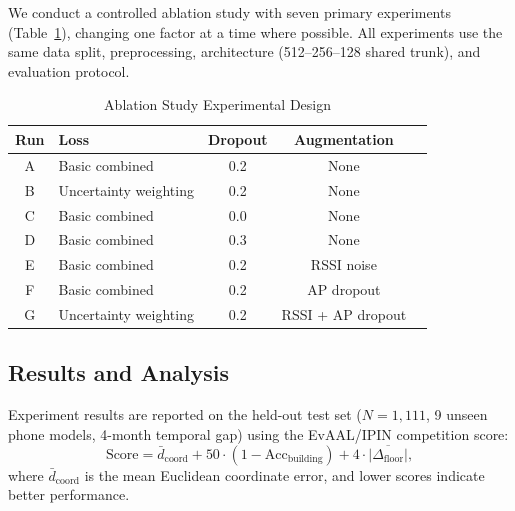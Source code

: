 We conduct a controlled ablation study with seven primary experiments (Table~\ref{tab:ablation_design}), changing one factor at a time where possible. All experiments use the same data split, preprocessing, architecture (512--256--128 shared trunk), and evaluation protocol.

\begin{table}[htbp]
\centering
\caption{Ablation Study Experimental Design}
\label{tab:ablation_design}
\begin{tabular}{clccc}
\hline
\textbf{Run} & \textbf{Loss} & \textbf{Dropout} & \textbf{Augmentation} \\
\hline
A & Basic combined & 0.2 & None \\
B & Uncertainty weighting & 0.2 & None \\
C & Basic combined & 0.0 & None \\
D & Basic combined & 0.3 & None \\
E & Basic combined & 0.2 & RSSI noise \\
F & Basic combined & 0.2 & AP dropout \\
G & Uncertainty weighting & 0.2 & RSSI + AP dropout \\
\hline
\end{tabular}
\end{table}

\subsection{Results and Analysis}

Experiment results are reported on the held-out test set ($N = 1{,}111$, 9 unseen phone models, 4-month temporal gap) using the EvAAL/IPIN competition score:
\begin{equation}
\text{Score} = \bar{d}_{\text{coord}} + 50 \cdot (1 - \text{Acc}_{\text{building}}) + 4 \cdot \overline{|\Delta_{\text{floor}}|},
\label{eq:evaal}
\end{equation}
where $\bar{d}_{\text{coord}}$ is the mean Euclidean coordinate error, and lower scores indicate better performance.

